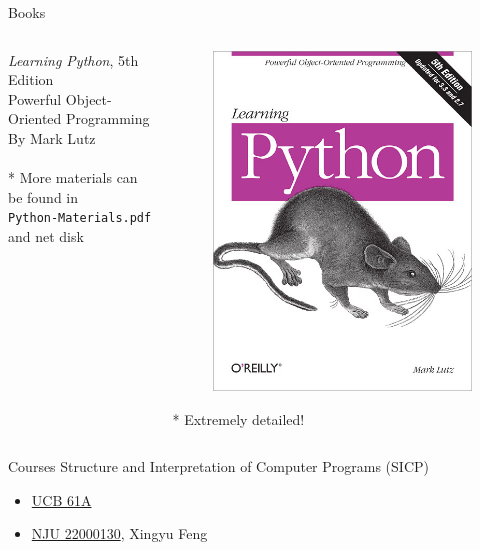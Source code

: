 \documentclass{../TexTemplate/myslide}
\begin{document}
\begin{frame}[fragile]{Books}
\begin{columns}
\begin{column}{0.5\linewidth}
\emph{Learning Python}, 5th Edition\\
Powerful Object-Oriented Programming\\
By Mark Lutz\\
\bigskip
\quad\\
* More materials can be found in\\
\verb'Python-Materials.pdf' and net disk
\end{column}
\begin{column}{0.5\linewidth}
\begin{figure}
\centering
\includegraphics[width=0.8\linewidth]{fig/learning-python.jpg}
\end{figure}
* Extremely detailed!
\end{column}
\end{columns}
\end{frame}

\begin{frame}[fragile]{Courses}
Structure and Interpretation of Computer Programs (SICP)
\begin{itemize}
	\item \href{https://cs61a.org/}{UCB 61A}
	\item \href{https://cs.nju.edu.cn/xyfeng/teaching/SICP/}{NJU 22000130}, Xingyu Feng
\end{itemize}
\end{frame}
\end{document}
